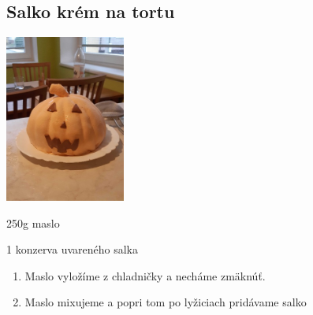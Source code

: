 \setcounter{step}{0}
\subsection{Salko krém na tortu}

\begin{ingredient}
\includegraphics[height=5.5cm]{images/pistkot_krem_salko}
\def\portions{4}%

\begin{main}
	\item 250g maslo
	\item 1 konzerva uvareného salka
\end{main}
\end{ingredient}
\begin{recipe}

\begin{enumerate}


\item{Maslo vyložíme z chladničky a necháme zmäknúť.}
\item{Maslo mixujeme a popri tom po lyžiciach pridávame salko}


\end{enumerate}
\end{recipe}

\begin{notes}

\end{notes}
\clearpage	